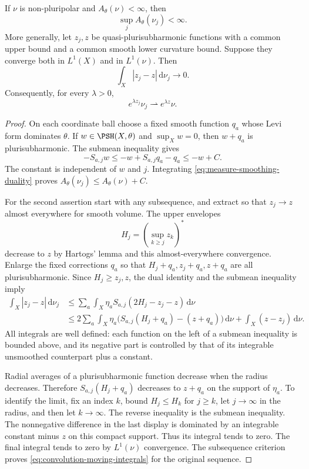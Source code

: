 \begin{lemma}\label{lem:measure-smoothing-integrals}
If $\nu$ is non-pluripolar and $A_\theta(\nu)<\infty$, then
\[
 \sup_j A_\theta(\nu_j)<\infty.
\]
More generally, let $z_j,z$ be quasi-plurisubharmonic functions with a common upper bound and a common smooth lower curvature bound. Suppose they converge both in $L^1(X)$ and in $L^1(\nu)$. Then
\begin{equation}\label{eq:convolution-moving-integrals}
 \int_X|z_j-z|\,\mathrm{d}\nu_j\longrightarrow0.
\end{equation}
Consequently, for every $\lambda>0$,
\[
 e^{\lambda z_j}\nu_j\rightharpoonup e^{\lambda z}\nu.
\]
\end{lemma}
\begin{proof}
On each coordinate ball choose a fixed smooth function $q_a$ whose Levi form dominates $\theta$. If $w\in\PSH(X,\theta)$ and $\sup_Xw=0$, then $w+q_a$ is plurisubharmonic. The submean inequality gives
\[
 -S_{a,j}w\leq-w+S_{a,j}q_a-q_a\leq-w+C.
\]
The constant is independent of $w$ and $j$. Integrating \eqref{eq:measure-smoothing-duality} proves $A_\theta(\nu_j)\leq A_\theta(\nu)+C$.

For the second assertion start with any subsequence, and extract so that $z_j\to z$ almost everywhere for smooth volume. The upper envelopes
\[
 H_j=\left(\sup_{k\geq j}z_k\right)^*
\]
decrease to $z$ by Hartogs' lemma and this almost-everywhere convergence. Enlarge the fixed corrections $q_a$ so that $H_j+q_a,z_j+q_a,z+q_a$ are all plurisubharmonic. Since $H_j\geq z_j,z$, the dual identity and the submean inequality imply
\[
 \begin{split}
 \int_X|z_j-z|\,\mathrm{d}\nu_j
 &\leq\sum_a\int_X\eta_a S_{a,j}(2H_j-z_j-z)\,\mathrm{d}\nu\\
 &\leq2\sum_a\int_X\eta_a
       \bigl(S_{a,j}(H_j+q_a)-(z+q_a)\bigr)\,\mathrm{d}\nu
       +\int_X(z-z_j)\,\mathrm{d}\nu.
 \end{split}
\]
All integrals are well defined: each function on the left of a submean inequality is bounded above, and its negative part is controlled by that of its integrable unsmoothed counterpart plus a constant.

Radial averages of a plurisubharmonic function decrease when the radius decreases. Therefore $S_{a,j}(H_j+q_a)$ decreases to $z+q_a$ on the support of $\eta_a$. To identify the limit, fix an index $k$, bound $H_j\leq H_k$ for $j\geq k$, let $j\to\infty$ in the radius, and then let $k\to\infty$. The reverse inequality is the submean inequality. The nonnegative difference in the last display is dominated by an integrable constant minus $z$ on this compact support. Thus its integral tends to zero. The final integral tends to zero by $L^1(\nu)$ convergence. The subsequence criterion proves \eqref{eq:convolution-moving-integrals} for the original sequence.


\end{proof}

